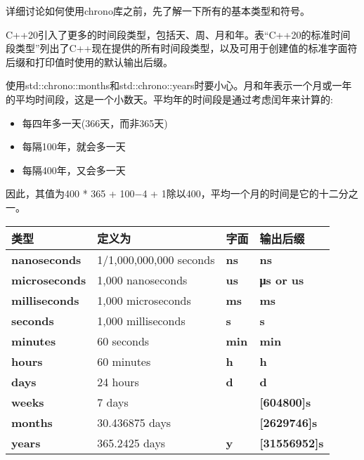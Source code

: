 
详细讨论如何使用chrono库之前，先了解一下所有的基本类型和符号。


C++20引入了更多的时间段类型，包括天、周、月和年。表“C++20的标准时间段类型”列出了C++现在提供的所有时间段类型，以及可用于创建值的标准字面符后缀和打印值时使用的默认输出后缀。

使用std::chrono::months和std::chrono::years时要小心。月和年表示一个月或一年的平均时间段，这是一个小数天。平均年的时间段是通过考虑闰年来计算的:

\begin{itemize}
\item 
每四年多一天(366天，而非365天)

\item 
每隔100年，就会多一天

\item 
每隔400年，又会多一天
\end{itemize}

因此，其值为400 * 365 + 100−4 + 1除以400，平均一个月的时间是它的十二分之一。

\begin{longtable}[c]{|l|l|l|l|}
\hline
\textbf{类型}         & \textbf{定义为}     & \textbf{字面} & \textbf{输出后缀}   \\ \hline
\endfirsthead
%
\endhead
%
\textbf{nanoseconds}  & 1/1,000,000,000 seconds & \textbf{ns}      & \textbf{ns}              \\ \hline
\textbf{microseconds} & 1,000 nanoseconds       & \textbf{us}      & \textbf{μs or us}        \\ \hline
\textbf{milliseconds} & 1,000 microseconds      & \textbf{ms}      & \textbf{ms}              \\ \hline
\textbf{seconds}      & 1,000 milliseconds      & \textbf{s}       & \textbf{s}               \\ \hline
\textbf{minutes}      & 60 seconds              & \textbf{min}     & \textbf{min}             \\ \hline
\textbf{hours}        & 60 minutes              & \textbf{h}       & \textbf{h}               \\ \hline
\textbf{days}         & 24 hours                & \textbf{d}       & \textbf{d}               \\ \hline
\textbf{weeks}        & 7 days                  & \textbf{}        & \textbf{{[}604800{]}s}   \\ \hline
\textbf{months}       & 30.436875 days          & \textbf{}        & \textbf{{[}2629746{]}s}  \\ \hline
\textbf{years}        & 365.2425 days           & \textbf{y}       & \textbf{{[}31556952{]}s} \\ \hline
\end{longtable}

